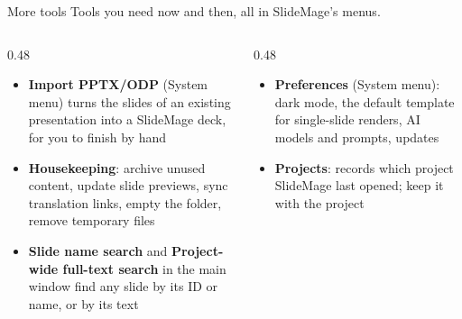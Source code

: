 
\begin{standardframe}{More tools}
	\small
	Tools you need now and then, all in SlideMage's \textcolor{c_primary_highlight}{menus}.
	\par\medskip
	\begin{columns}[T,onlytextwidth]
		\begin{column}{0.48\linewidth}
			\begin{itemize}
				\item \textbf{Import PPTX/ODP} (System menu) turns the slides of an existing presentation into a SlideMage deck, for you to finish by hand
				\item \textbf{Housekeeping}: archive unused content, update slide previews, sync translation links, empty the  folder, remove temporary files
				\item \textbf{Slide name search} and \textbf{Project-wide full-text search} in the main window find any slide by its ID or name, or by its text
			\end{itemize}
		\end{column}
		\begin{column}{0.48\linewidth}
			\begin{itemize}
				\item \textbf{Preferences} (System menu): dark mode, the default template for single-slide renders, AI models and prompts, updates
				\item \textbf{Projects}:  records which project SlideMage last opened; keep it with the project
			\end{itemize}
		\end{column}
	\end{columns}
\end{standardframe}
